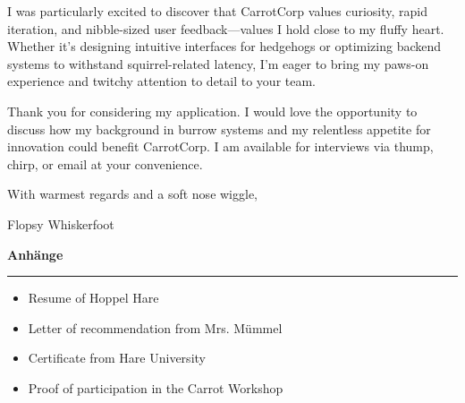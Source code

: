\documentclass[
11pt, %
]{letter}
\begin{document}
	I was particularly excited to discover that CarrotCorp values curiosity, rapid iteration, and nibble-sized user feedback—values I hold close to my fluffy heart. Whether it’s designing intuitive interfaces for hedgehogs or optimizing backend systems to withstand squirrel-related latency, I’m eager to bring my paws-on experience and twitchy attention to detail to your team.
	
	Thank you for considering my application. I would love the opportunity to discuss how my background in burrow systems and my relentless appetite for innovation could benefit CarrotCorp. I am available for interviews via thump, chirp, or email at your convenience.
	
	\smallskip
	
	With warmest regards and a soft nose wiggle,
	
	
	Flopsy Whiskerfoot
	
	
	\newpage
	
	\textcolor{RubricTextColor}{\textbf{Anhänge}} \\
	\textcolor{RubricTextColor}{\rule{\linewidth}{1pt}} %
	
	\begin{itemize}
		\item Resume of Hoppel Hare
		\item Letter of recommendation from Mrs. Mümmel
		\item Certificate from Hare University
		\item Proof of participation in the Carrot Workshop
	\end{itemize}
	
	
\end{document}
